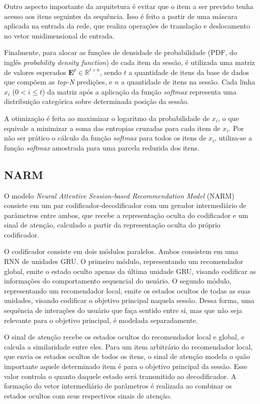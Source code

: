 Outro aspecto importante da arquitetura é evitar que o item a ser previsto tenha
acesso aos itens seguintes da sequência. Isso é feito a partir de uma máscara
aplicada na entrada da rede, que realiza operações de translação e deslocamento
no vetor unidimensional de entrada.

Finalmente, para alocar as funções de densidade de probabilidade (PDF, do inglês
\textit{probability density function}) de cada item da sessão, é utilizada uma
matriz de valores esperados $\mathbf{E}^{p} \in \mathbb{R}^{t \times n}$, sendo
$t$ a quantidade de itens da base de dados que compõem as \textit{top-N}
predições, e $n$ a quantidade de itens na sessão. Cada linha $x_i$ ($0 < i \leq
t$) da matriz após a aplicação da função \textit{softmax} representa uma
distribuição categórica sobre determinada posição da sessão.

A otimização é feita ao maximizar o logaritmo da probabilidade de $x_i$, o que
equivale a minimizar a soma das entropias cruzadas para cada item de $x_i$. Por
não ser prático o cálculo da função \textit{softmax} para todos os itens de
$x_i$, utiliza-se a função \textit{softmax} amostrada para uma parcela reduzida
dos itens.

\subsection{NARM}
O modelo \textit{Neural Attentive Session-based Recommendation Model} (NARM)
\cite{narm} consiste em um par codificador-decodificador com um gerador
intermediário de parâmetros entre ambos, que recebe a representação oculta do
codificador e um sinal de atenção, calculado a partir da representação oculta do
próprio codificador.

O codificador consiste em dois módulos paralelos. Ambos consistem em uma RNN de
unidades GRU. O primeiro módulo, representando um recomendador global, emite o
estado oculto apenas da última unidade GRU, visando codificar as informações do
comportamento sequencial do usuário. O segundo módulo, representando um
recomendador local, emite os estados ocultos de todas as suas unidades, visando
codificar o objetivo principal naquela sessão. Dessa forma, uma sequência de
interações do usuário que faça sentido entre si, mas que não seja relevante para
o objetivo principal, é modelada separadamente.

O sinal de atenção recebe os estados ocultos do recomendador local e global, e
calcula a similaridade entre eles. Para um item arbitrário do recomendador local, que envia os estados ocultos de
todos os itens, o sinal de atenção modela o quão importante aquele determinado
item é para o objetivo principal da sessão. Esse valor controla o quanto daquele
estado será transmitido ao decodificador. A formação do vetor intermediário de
parâmetros é realizada ao combinar os estados ocultos com seus respectivos
sinais de atenção.

